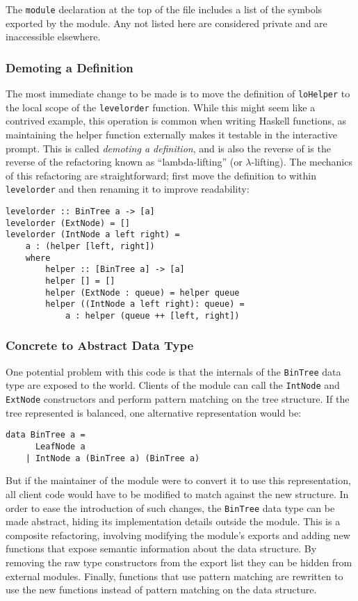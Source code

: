 \documentclass{article}
\begin{document}
The \verb!module! declaration at the top of the file includes a list of the symbols exported by the module.
Any not listed here are considered private and are inaccessible elsewhere.

\subsubsection{Demoting a Definition}

The most immediate change to be made is to move the definition of \verb!loHelper! to the local scope of the \verb!levelorder! function.  
While this might seem like a contrived example, this operation is common when writing Haskell functions, as maintaining the helper function externally makes it testable in the interactive prompt.
This is called \textit{demoting a definition}\cite{li2006refactoring}, and is also the reverse of  is the reverse of the refactoring known as ``lambda-lifting'' (or $\lambda$-lifting)\cite{haskellwikilifting}.
The mechanics of this refactoring are straightforward; first move the definition to within \verb!levelorder! and then renaming it to improve readability:

\begin{verbatim}
levelorder :: BinTree a -> [a]
levelorder (ExtNode) = []
levelorder (IntNode a left right) =
    a : (helper [left, right])
    where
        helper :: [BinTree a] -> [a]
        helper [] = []
        helper (ExtNode : queue) = helper queue
        helper ((IntNode a left right): queue) =
            a : helper (queue ++ [left, right])
\end{verbatim}

\subsubsection{Concrete to Abstract Data Type}

One potential problem with this code is that the internals of the \verb!BinTree! data type are exposed to the world.
Clients of the module can call the \verb!IntNode! and \verb!ExtNode! constructors and perform pattern matching on the tree structure.
If the tree represented is balanced, one alternative representation would be:

\begin{verbatim}
data BinTree a = 
      LeafNode a
    | IntNode a (BinTree a) (BinTree a)
\end{verbatim}

\noindent But if the maintainer of the module were to convert it to use this representation, all client code would have to be modified to match against the new structure\cite{thompson2005refactoring}.
In order to ease the introduction of such changes, the \verb!BinTree! data type can be made abstract, hiding its implementation details outside the module.
This is a composite refactoring, involving modifying the module's exports and adding new functions that expose semantic information about the data structure.
By removing the raw type constructors from the export list they can be hidden from external modules.
Finally, functions that use pattern matching are rewritten to use the new functions instead of pattern matching on the data structure.
\end{document}
